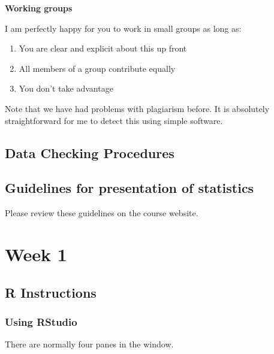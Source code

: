 \documentclass[]{book}
\providecommand{\tightlist}{%
  \setlength{\itemsep}{0pt}\setlength{\parskip}{0pt}}
\begin{document}
\textbf{Working groups}

I am perfectly happy for you to work in small groups as long as:

\begin{enumerate}
\def\labelenumi{\arabic{enumi}.}
\tightlist
\item
  You are clear and explicit about this up front
\item
  All members of a group contribute equally
\item
  You don't take advantage
\end{enumerate}

Note that we have had problems with plagiarism before. It is absolutely straightforward for me to detect this using simple software.

\hypertarget{data-checking-procedures}{%
\section*{Data Checking Procedures}\label{data-checking-procedures}}

\hypertarget{guidelines-for-presentation-of-statistics}{%
\section*{Guidelines for presentation of statistics}\label{guidelines-for-presentation-of-statistics}}

Please review these guidelines on the course website.

\hypertarget{week-1}{%
\chapter{Week 1}\label{week-1}}

\hypertarget{r-instructions}{%
\section{R Instructions}\label{r-instructions}}

\hypertarget{using-rstudio}{%
\subsection{Using RStudio}\label{using-rstudio}}

There are normally four panes in the window.
\end{document}
